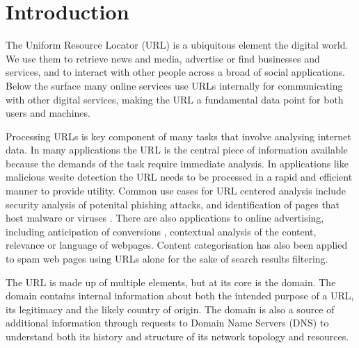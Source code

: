 \documentclass[sigconf]{acmart}
\begin{document}


\maketitle

\section{Introduction}

The Uniform Resource Locator (URL) is a ubiquitous element the digital world. 
We use them to retrieve news and media, advertise or find businesses and services, 
and to interact with other people across a broad of social applications. Below the
surface many online services use URLs internally for communicating with other digital
services, making the URL a fundamental data point for both users and machines.

Processing URLs is key component of many tasks that involve
analysing internet data. In many applications the URL is the central piece of 
information available because the demands of the task require immediate analysis.
In applications like malicious wesite detection the URL needs to be processed
in a rapid and efficient manner to provide utility\cite{Ma2009b}.
Common use cases for URL centered analysis include security analysis of potenital phishing 
attacks\cite{Garera2007,Basnet2012,Basnet2014,Mamun2016,Verma2017,Vazhayil2018,Tupsamudre2019,Sirigineedi2020,Li2020}, 
and identification of pages that host malware or viruses \cite{Canali2011,Mamun2016}.
There are also applications to online advertising,
including anticipation of conversions \cite{Qiu2020}, contextual analysis of
the content\cite{Kan2004,Shih2004,Baykan2009,Meshkizadeh2010,Hernandez2012,Arya2016}, relevance \cite{Kan2005} 
or language\cite{Baykan2013} of webpages. 
Content categorisation has also been applied to spam web pages using URLs alone for the sake
of search results filtering\cite{Chung2010,Hassan2008}.

The URL is made up of multiple elements, but at its core is the domain. The domain
contains internal information about both the intended purpose of a URL, its legitimacy 
and the likely country of origin. The domain is also a source of additional information 
through requests to Domain Name Servers (DNS) to understand both its history and structure
 of its network topology and resources.
\end{document}
